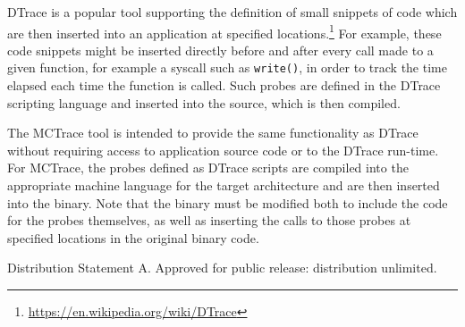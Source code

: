 DTrace is a popular tool supporting the definition of small snippets
of code which are then inserted into an application at specified
locations.\footnote{\url{https://en.wikipedia.org/wiki/DTrace}} For
example, these code snippets might be inserted directly before and
after every call made to a given function, for example a syscall such
as \texttt{write()}, in order to track the time elapsed each time the
function is called. Such probes are defined in the DTrace scripting
language and inserted into the source, which is then compiled.

The MCTrace tool is intended to provide the same functionality as DTrace
without requiring access to application source code or to the DTrace
run-time. For MCTrace, the probes defined as DTrace scripts are compiled
into the appropriate machine language for the target architecture and
are then inserted into the binary. Note that the binary must be modified
both to include the code for the probes themselves, as well as inserting
the calls to those probes at specified locations in the original binary
code.

\vspace{0.25in}

\noindent\small{Distribution Statement A. Approved for public release:
distribution unlimited.}

  
